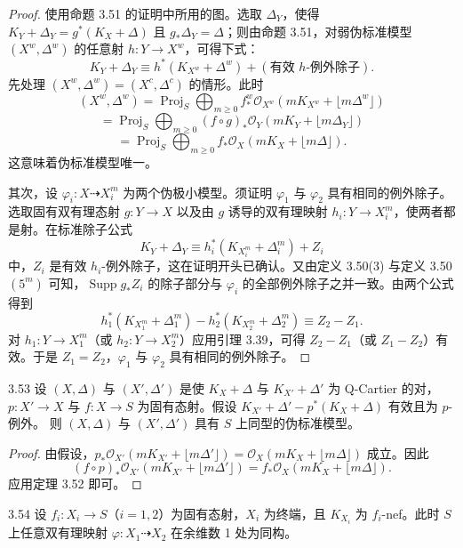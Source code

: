 \begin{proof}
使用命题 3.51 的证明中所用的图。选取 $\Delta_Y$，使得 $K_Y+\Delta_Y=g^*(K_X+\Delta)$ 且 $g_*\Delta_Y=\Delta$；则由命题 3.51，对弱伪标准模型 $(X^{w},\Delta^{w})$ 的任意射 $h:Y\to X^{w}$，可得下式：
\[
K_Y+\Delta_Y \equiv h^*(K_{X^{w}}+\Delta^{w})+(\text{有效 } h\text{-例外除子}).
\]
先处理 $(X^{w},\Delta^{w})=(X^{c},\Delta^{c})$ 的情形。此时
\[
(X^{w},\Delta^{w})=\operatorname{Proj}_S \bigoplus_{m\ge0} f^{w}_*\mathcal{O}_{X^{w}}(mK_{X^{w}}+\lfloor m\Delta^{w}\rfloor)
\]
\[
=\operatorname{Proj}_S \bigoplus_{m\ge0} (f\circ g)_*\mathcal{O}_Y(mK_Y+\lfloor m\Delta_Y\rfloor)
\]
\[
=\operatorname{Proj}_S \bigoplus_{m\ge0} f_*\mathcal{O}_X(mK_X+\lfloor m\Delta\rfloor).
\]
这意味着伪标准模型唯一。

其次，设 $\varphi_i:X\dashrightarrow X_i^{m}$ 为两个伪极小模型。须证明 $\varphi_1$ 与 $\varphi_2$ 具有相同的例外除子。选取固有双有理态射 $g:Y\to X$ 以及由 $g$ 诱导的双有理映射 $h_i:Y\to X_i^{m}$，使两者都是射。在标准除子公式
\[
K_Y+\Delta_Y \equiv h_i^*(K_{X_i^{m}}+\Delta_i^{m})+Z_i
\]
中，$Z_i$ 是有效 $h_i$-例外除子，这在证明开头已确认。又由定义 3.50(3) 与定义 3.50$(5^{m})$ 可知，$\operatorname{Supp}g_*Z_i$ 的除子部分与 $\varphi_i$ 的全部例外除子之并一致。由两个公式得到
\[
h_1^*(K_{X_1^{m}}+\Delta_1^{m})-h_2^*(K_{X_2^{m}}+\Delta_2^{m})\equiv Z_2-Z_1.
\]
对 $h_1:Y\to X_1^{m}$（或 $h_2:Y\to X_2^{m}$）应用引理 3.39，可得 $Z_2-Z_1$（或 $Z_1-Z_2$）有效。于是 $Z_1=Z_2$，$\varphi_1$ 与 $\varphi_2$ 具有相同的例外除子。
\end{proof}

\begin{corollaryp}{3.53}
设 $(X,\Delta)$ 与 $(X',\Delta')$ 是使 $K_X+\Delta$ 与 $K_{X'}+\Delta'$ 为 Q-Cartier 的对，$p:X'\to X$ 与 $f:X\to S$ 为固有态射。假设 $K_{X'}+\Delta'-p^*(K_X+\Delta)$ 有效且为 $p$-例外。
则 $(X,\Delta)$ 与 $(X',\Delta')$ 具有 $S$ 上同型的伪标准模型。
\end{corollaryp}

\begin{proof}
由假设，$p_*\mathcal{O}_{X'}(mK_{X'}+\lfloor m\Delta'\rfloor)=\mathcal{O}_X(mK_X+\lfloor m\Delta\rfloor)$ 成立。因此
\[
(f\circ p)_*\mathcal{O}_{X'}(mK_{X'}+\lfloor m\Delta'\rfloor)=f_*\mathcal{O}_X(mK_X+\lfloor m\Delta\rfloor).
\]
应用定理 3.52 即可。
\end{proof}

\begin{corollaryp}{3.54}
设 $f_i:X_i\to S$（$i=1,2$）为固有态射，$X_i$ 为终端，且 $K_{X_i}$ 为 $f_i$-nef。此时 $S$ 上任意双有理映射 $\varphi:X_1\dashrightarrow X_2$ 在余维数 1 处为同构。
\end{corollaryp}

